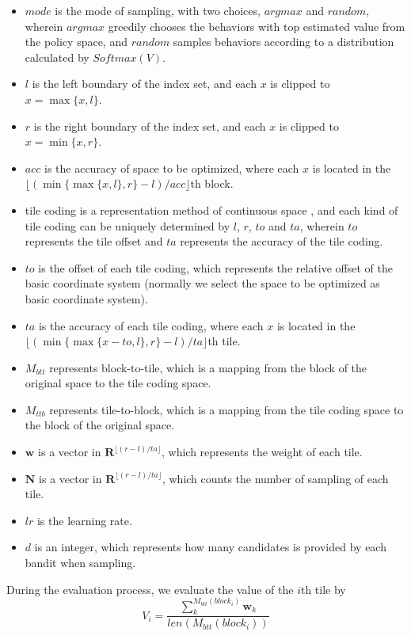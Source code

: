 \begin{itemize}
    \item $mode$ is the mode of sampling, with two choices, $argmax$ and $random$, wherein $argmax$ greedily chooses the behaviors with top estimated value from the policy space, and $random$ samples behaviors according to a distribution calculated by $Softmax(V)$.
    \item $l$ is the left boundary of the index set, and each $x$ is clipped to $x = \max \{x, l\}$.
    \item $r$ is the right boundary of the index set, and each $x$ is clipped to $x = \min \{x, r\}$.
    \item $acc$ is the accuracy of space to be optimized, where each $x$ is located in the $\lfloor (\min\{\max\{x, l\}, r\} - l) / acc \rfloor$th block.
    \item tile coding is a representation method of continuous space \citep{sutton}, and each kind of tile coding can be uniquely determined by $l$, $r$, $to$ and $ta$, wherein $to$ represents the tile offset and $ta$ represents the accuracy of the tile coding.
    \item $to$ is the offset of each tile coding, which represents the relative offset of the basic coordinate system (normally we select the space to be optimized as basic coordinate system).
    \item $ta$ is the accuracy of each tile coding, where each $x$ is located in the $\lfloor (\min\{\max\{x-to, l\}, r\} - l) / ta \rfloor$th tile.
    \item $M_{btt}$ represents block-to-tile, which is a mapping from the block of the original space to the tile coding space.
    \item $M_{ttb}$ represents tile-to-block, which is a mapping from the tile coding space to the block of the original space.
    \item $\textbf{w}$ is a vector in $\mathbf{R}^{\lfloor (r-l) / ta \rfloor}$, which represents the weight of each tile.
    \item $\textbf{N}$ is a vector in $\mathbf{R}^{\lfloor (r-l) / ta \rfloor}$, which counts the number of sampling of each tile.
    \item $lr$ is the learning rate.
    \item $d$ is an integer, which represents how many candidates is provided by each bandit when sampling.
\end{itemize}

During the evaluation process, we evaluate the value of the $i$th tile by
\begin{equation}
\label{eq:bandit_eval}
V_i = \frac{\sum_{k}^{M_{btt}(block_i)} \textbf{w}_k}{len(M_{btt}(block_i))}
\end{equation}



